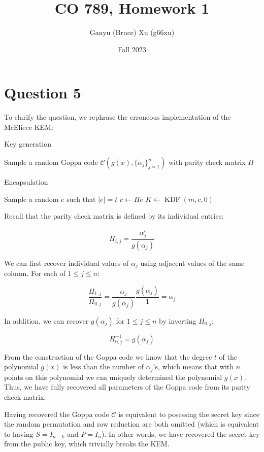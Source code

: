 \documentclass{article}
\title{CO 789, Homework 1}
\author{Ganyu (Bruce) Xu (g66xu)}
\date{Fall 2023}
\newcommand{\norm}[1]{\vert {#1} \vert}
\begin{document}

\section*{Question 5}
To clarify the question, we rephrase the erroneous implementation of the McEliece KEM:

\begin{algorithm}
    \caption{Key generation}
    Sample a random Goppa code $\mathcal{C}(g(x), \{\alpha_j\}_{j=1}^n)$ with parity check matrix $H$\;
\end{algorithm}

\begin{algorithm}
    \caption{Encapsulation}
    Sample a random $e$ such that $\norm{e} = t$\;
    $c \leftarrow He$\;
    $K \leftarrow \operatorname{KDF}(m, c, 0)$
    \;
\end{algorithm}

Recall that the parity check matrix is defined by its individual entries:

\begin{equation*}
    H_{i,j} = \frac{\alpha_j^i}{g(\alpha_j)}
\end{equation*}

We can first recover individual values of $\alpha_j$ using adjacent values of the same column. For each of $1 \leq j \leq n$:

\begin{equation*}
    \frac{H_{1,j}}{H_{0,j}} 
    = \frac{\alpha_j}{g(\alpha_j)} \frac{g(\alpha_j)}{1}
    = \alpha_j
\end{equation*}

In addition, we can recover $g(\alpha_j)$ for $1 \leq j \leq n$ by inverting $H_{0,j}$:

\begin{equation*}
    H_{0,j}^{-1} = g(\alpha_j)
\end{equation*}

From the construction of the Goppa code we know that the degree $t$ of the polynomial $g(x)$ is less than the number of $\alpha_j$'s, which means that with $n$ points on this polynomial we can uniquely determined the polynomial $g(x)$. Thus, we have fully recovered all parameters of the Goppa code from its parity check matrix.

Having recovered the Goppa code $\mathcal{C}$ is equivalent to posessing the secret key since the random permutation and row reduction are both omitted (which is equivalent to having $S = I_{n-k}$ and $P = I_n$). In other words, we have recovered the secret key from the public key, which trivially breaks the KEM.
\end{document}
